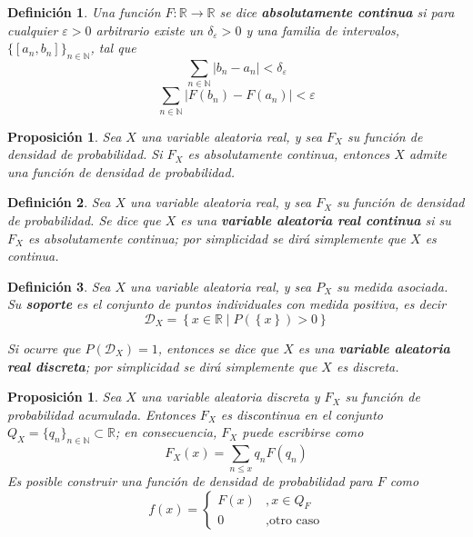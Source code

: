 \documentclass[12pt,letterpaper,draft]{book}
\newtheorem{definicion}{Definición}[chapter]
\newtheorem{proposicion}[teorema]{Proposición}
\newcommand{\R}{\mathbb{R}}
\newcommand{\N}{\mathbb{N}}
\newcommand{\abso}[1]{\left| #1 \right|}
\newcommand{\talque}{\mathrel{}\middle|\mathrel{}}
\begin{document}
\begin{definicion}
Una función $F: \R \rightarrow \R$ se dice \textbf{absolutamente continua} si para cualquier $\varepsilon>0$ arbitrario existe un $\delta_\varepsilon>0$ y una familia de intervalos, $\{ [a_n, b_n]\}_{n\in \N}$, tal que
\begin{equation}
\sum_{n\in \N} \abso{b_n - a_n} < \delta_\varepsilon
\end{equation}
\begin{equation}
\sum_{n\in \N} \abso{F(b_n) - F(a_n)} < \varepsilon 
\end{equation}
\end{definicion}

\begin{proposicion}
Sea $X$ una variable aleatoria real, y sea $F_X$ su función de densidad de probabilidad.
%
Si $F_X$ es absolutamente continua, entonces $X$ admite una función de densidad de probabilidad.
\end{proposicion}

\begin{definicion}
Sea $X$ una variable aleatoria real, y sea $F_X$ su función de densidad de probabilidad.
%
Se dice que $X$ es una \textbf{variable aleatoria real continua} si su $F_X$ es absolutamente continua; por simplicidad se dirá simplemente que $X$ es continua.
\end{definicion}

\begin{definicion}
Sea $X$ una variable aleatoria real, y sea $P_X$ su medida asociada.
%
Su \textbf{soporte} es el conjunto de puntos individuales con medida positiva, es decir
\begin{equation}
\mathcal{D}_X = \left\{ x\in \R \talque P\left( \left\{ x\right\} \right)>0 \right\}
\end{equation}

Si ocurre que $P(\mathcal{D}_X) = 1$, entonces se dice que $X$ es una \textbf{variable aleatoria real discreta}; por simplicidad se dirá simplemente que $X$ es discreta.
\end{definicion}

\begin{proposicion}
Sea $X$ una variable aleatoria discreta y $F_X$ su función de probabilidad acumulada.
%
Entonces $F_X$ es discontinua en el conjunto $Q_X=\{q_n\}_{n\in \N} \subset \R$; en consecuencia, $F_X$ puede escribirse como 
\begin{equation}
F_X(x) = \sum_{n\leq x} q_n F({q_n})
\end{equation}
Es posible construir una función de densidad de probabilidad para $F$ como
\begin{equation}
f(x) = \begin{cases}
F({x}) &, x\in Q_F \\
0 &, \text{otro caso}
\end{cases}
\end{equation}
\end{proposicion}
\end{document}
